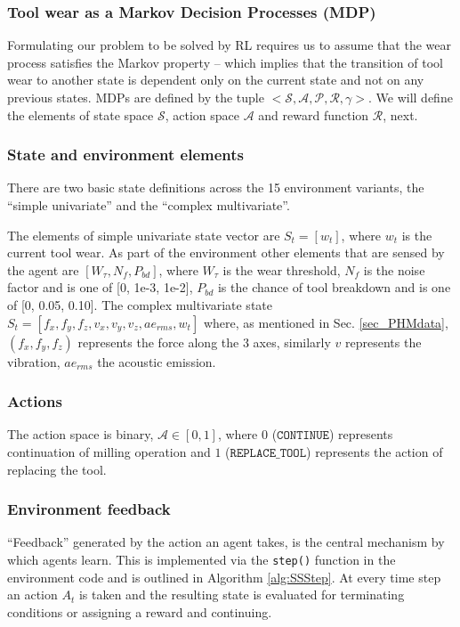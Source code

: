 \documentclass[referee, sn-mathphys-num]{sn-jnl}
\begin{document}
	\subsubsection*{Tool wear as a Markov Decision Processes (MDP)}
	Formulating our problem to be solved by RL requires us to assume that the wear process satisfies the Markov property -- which implies that the transition of tool wear to another state is dependent only on the current state and not on any previous states. MDPs are defined by the tuple $<\mathcal{S, A, P, R, \gamma}>$. We will define the elements of state space $\mathcal{S}$, action space $\mathcal{A}$ and reward function $\mathcal{R}$, next.
	
	\subsubsection*{State and environment elements}
	There are two basic state definitions across the 15 environment variants, the ``simple univariate'' and the ``complex multivariate''. 
	
	The elements of simple univariate state vector are $S_t = [w_t]$, where $w_t$ is the current tool wear. As part of the environment other elements that are sensed by the agent are $[W_\tau, N_f, P_{bd}]$, where $W_\tau$ is the wear threshold, $N_f$ is the noise factor and is one of [0, 1e-3, 1e-2], $P_{bd}$ is the chance of tool breakdown and is one of [0, 0.05, 0.10]. The complex multivariate state $S_t = [f_x, f_y, f_z, v_x, v_y, v_z, ae_{rms}, w_t]$ where, as mentioned in Sec. \ref{sec_PHMdata}, $(f_x, f_y, f_z)$ represents the force along the 3 axes, similarly $v$ represents the vibration, $ae_{rms}$ the acoustic emission.
	
	\subsubsection*{Actions}
	The action space is binary, $\mathcal{A} \in [0, 1]$, where $0$ ($\texttt{CONTINUE}$) represents continuation of milling operation and $1$ ($\texttt{REPLACE\_TOOL}$) represents the action of replacing the tool.
	
	\subsubsection*{Environment feedback}
	``Feedback'' generated by the action an agent takes, is the central mechanism by which agents learn. This is implemented via the \texttt{step()} function in the environment code and is outlined in Algorithm \ref{alg:SSStep}. At every time step an action $A_t$ is taken and the resulting state is evaluated for terminating conditions or assigning a reward and continuing.
	
\end{document}
